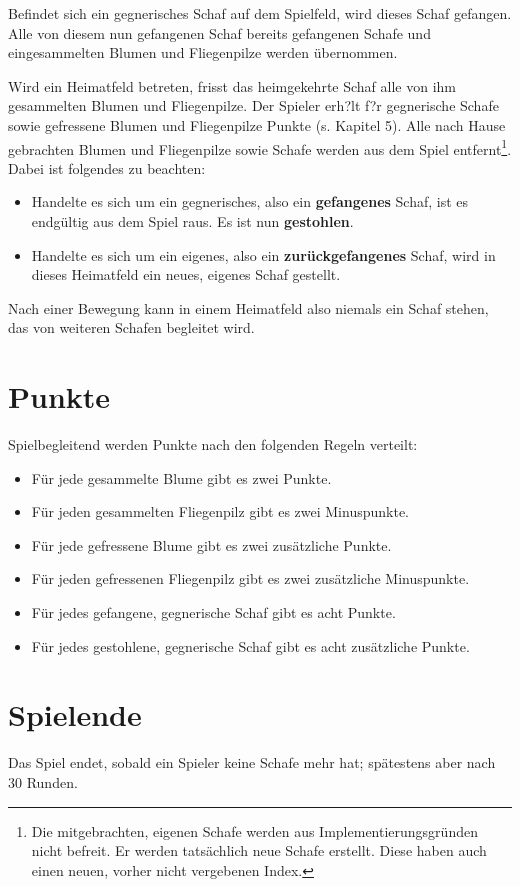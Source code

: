 \documentclass[11pt,pointlessnumbers,DIV10,BCOR10mm,tocleft]{scrreprt}
\begin{document}
Befindet sich ein gegnerisches Schaf auf dem Spielfeld, wird dieses Schaf gefangen. Alle von diesem nun gefangenen Schaf bereits gefangenen Schafe und eingesammelten Blumen und Fliegenpilze werden übernommen.

Wird ein Heimatfeld betreten, frisst das heimgekehrte Schaf alle von ihm gesammelten Blumen und Fliegenpilze. Der Spieler erh?lt f?r gegnerische Schafe sowie gefressene Blumen und Fliegenpilze Punkte (s. Kapitel 5). Alle nach Hause gebrachten Blumen und Fliegenpilze sowie Schafe werden aus dem Spiel entfernt\footnote{Die mitgebrachten, eigenen Schafe werden aus Implementierungsgründen nicht befreit. Er werden tatsächlich neue Schafe erstellt. Diese haben auch einen neuen, vorher nicht vergebenen Index.}. Dabei ist folgendes zu beachten:

\begin{itemize}
\item Handelte es sich um ein gegnerisches, also ein \textbf{gefangenes} Schaf, ist es endgültig aus dem Spiel raus. Es ist nun \textbf{gestohlen}.
\item Handelte es sich um ein eigenes, also ein \textbf{zurückgefangenes} Schaf, wird in dieses Heimatfeld ein neues, eigenes Schaf gestellt.
\end{itemize} 

Nach einer Bewegung kann in einem Heimatfeld also niemals ein Schaf stehen, das von weiteren Schafen begleitet wird.

\section{Punkte}
Spielbegleitend werden Punkte nach den folgenden Regeln verteilt:

\begin{itemize}
\item Für jede gesammelte Blume gibt es zwei Punkte.
\item Für jeden gesammelten Fliegenpilz gibt es zwei Minuspunkte.
\item Für jede gefressene Blume gibt es zwei zusätzliche Punkte.
\item Für jeden gefressenen Fliegenpilz gibt es zwei zusätzliche Minuspunkte.
\item Für jedes gefangene, gegnerische Schaf gibt es acht Punkte.
\item Für jedes gestohlene, gegnerische Schaf gibt es acht zusätzliche Punkte.
\end{itemize}

\section{Spielende}
Das Spiel endet, sobald ein Spieler keine Schafe mehr hat; spätestens aber nach 30 Runden.
\end{document}
